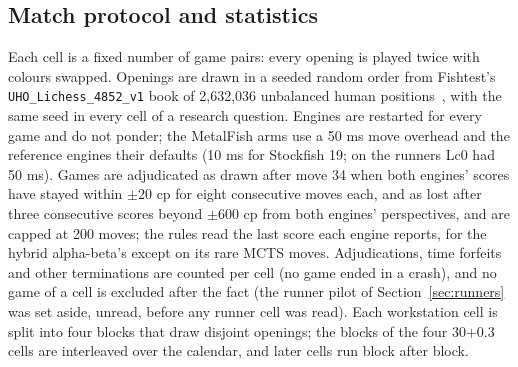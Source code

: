 \documentclass{article}
\newcommand{\MF}{MetalFish}
\begin{document}
\subsection{Match protocol and statistics}
\label{sec:match}
Each cell is a fixed number of game pairs: every opening is played twice with colours swapped. Openings are drawn in a seeded random order from Fishtest's \texttt{UHO\_Lichess\_4852\_v1} book of 2{,}632{,}036 unbalanced human positions~\cite{sfbooks}, with the same seed in every cell of a research question. Engines are restarted for every game and do not ponder; the \MF{} arms use a 50 ms move overhead and the reference engines their defaults (10 ms for Stockfish 19; on the runners Lc0 had 50 ms). Games are adjudicated as drawn after move 34 when both engines' scores have stayed within $\pm 20$ cp for eight consecutive moves each, and as lost after three consecutive scores beyond $\pm 600$ cp from both engines' perspectives, and are capped at 200 moves; the rules read the last score each engine reports, for the hybrid alpha-beta's except on its rare MCTS moves. Adjudications, time forfeits and other terminations are counted per cell (no game ended in a crash), and no game of a cell is excluded after the fact (the runner pilot of Section~\ref{sec:runners} was set aside, unread, before any runner cell was read). Each workstation cell is split into four blocks that draw disjoint openings; the blocks of the four 30+0.3 cells are interleaved over the calendar, and later cells run block after block.
\end{document}
